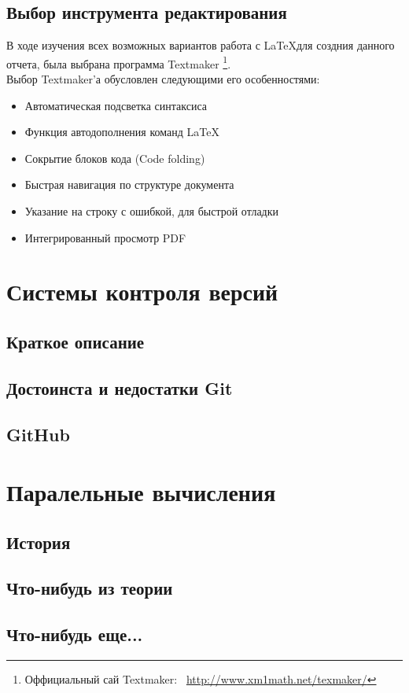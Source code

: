 \documentclass{article}
\begin{document}
		\subsection{Выбор инструмента редактирования}
			В ходе изучения всех возможных вариантов работа с \LaTeX для создния данного отчета, была выбрана программа Textmaker				\footnote{Оффициальный сай Textmaker:~ \href{http://www.xm1math.net/texmaker/}{http://www.xm1math.net/texmaker/}}.\\
		Выбор Textmaker'а обусловлен следующими его особенностями:
			\begin{itemize} 
	    		\item	Автоматическая подсветка синтаксиса
	    		\item	Функция автодополнения команд \LaTeX
	    		\item	Сокрытие блоков кода (Code folding)
	    		\item	Быстрая навигация по структуре документа
	    		\item	Указание на строку с ошибкой, для быстрой отладки
	    		\item	Интегрированный просмотр PDF
			\end{itemize} 
	\newpage
	\section{Системы контроля версий}
		\subsection{Краткое описание}
		\subsection{Достоинста и недостатки Git}
		\subsection{GitHub}
	\section{Паралельные вычисления}
		\subsection{История}
		\subsection{Что-нибудь из теории}
		\subsection{Что-нибудь еще...}
\end{document}
